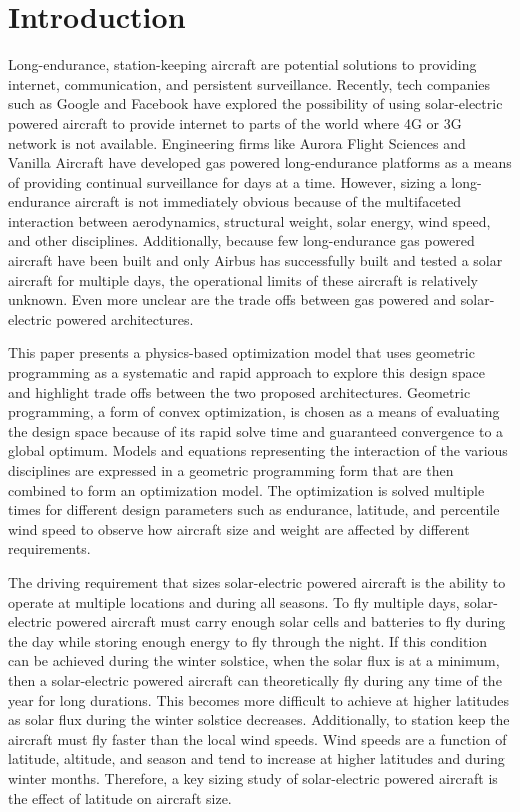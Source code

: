 \documentclass[]{aiaa-tc}%
\begin{document}
\section{Introduction}

Long-endurance, station-keeping aircraft are potential solutions to providing internet, communication, and persistent surveillance. 
Recently, tech companies such as Google\cite{googletitan} and Facebook\cite{aquila} have explored the possibility of using solar-electric powered aircraft to provide internet to parts of the world where 4G or 3G network is not available. 
Engineering firms like Aurora Flight Sciences\cite{orion} and Vanilla Aircraft\cite{vanilla} have developed gas powered long-endurance platforms as a means of providing continual surveillance for days at a time.  
However, sizing a long-endurance aircraft is not immediately obvious because of the multifaceted interaction between aerodynamics, structural weight, solar energy, wind speed, and other disciplines.
Additionally, because few long-endurance gas powered aircraft have been built and only Airbus has successfully built and tested a solar aircraft for multiple days\cite{zephyr}, the operational limits of these aircraft is relatively unknown. 
Even more unclear are the trade offs between gas powered and solar-electric powered architectures. 

This paper presents a physics-based optimization model that uses geometric programming as a systematic and rapid approach to explore this design space and highlight trade offs between the two proposed architectures.
Geometric programming, a form of convex optimization, is chosen as a means of evaluating the design space because of its rapid solve time and guaranteed convergence to a global optimum.\cite{gp}
Models and equations representing the interaction of the various disciplines are expressed in a geometric programming form that are then combined to form an optimization model. 
The optimization is solved multiple times for different design parameters such as endurance, latitude, and percentile wind speed to observe how aircraft size and weight are affected by different requirements. 

The driving requirement that sizes solar-electric powered aircraft is the ability to operate at multiple locations and during all seasons.  
To fly multiple days, solar-electric powered aircraft must carry enough solar cells and batteries to fly during the day while storing enough energy to fly through the night.\cite{solartech}
If this condition can be achieved during the winter solstice, when the solar flux is at a minimum, then a solar-electric powered aircraft can theoretically fly during any time of the year for long durations. \cite{solartech}
This becomes more difficult to achieve at higher latitudes as solar flux during the winter solstice decreases.  
Additionally, to station keep the aircraft must fly faster than the local wind speeds.  
Wind speeds are a function of latitude, altitude, and season and tend to increase at higher latitudes and during winter months. 
Therefore, a key sizing study of solar-electric powered aircraft is the effect of latitude on aircraft size.  
\end{document}
